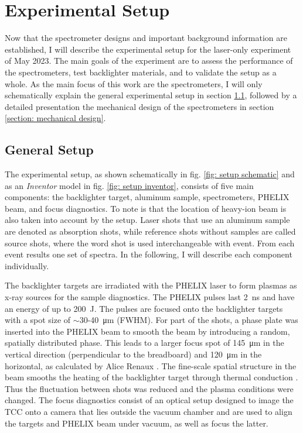\chapter{Experimental Setup}
\label{chapter: experimental setup}

Now that the spectrometer designs and important background information are 
established, I will describe the experimental setup for the laser-only 
experiment of May 2023. The main goals of the experiment are to assess the performance of the 
spectrometers, test backlighter materials, and to validate the setup as a 
whole. As the main focus of this work are the spectrometers, I will only 
schematically explain the general experimental setup in section \ref{section: general setup}, followed by a detailed presentation the mechanical design of the spectrometers in section \ref{section: mechanical design}. 

\section{General Setup}
\label{section: general setup}

The experimental setup, as shown schematically in fig. \ref{fig: setup 
schematic} and as an \textit{Inventor} model in fig. \ref{fig: setup inventor}, 
consists of five main components: the backlighter target, aluminum sample, 
spectrometers, 
PHELIX beam, and focus diagnostics. To note 
is that the location of heavy-ion 
beam is also taken into account by the setup. Laser shots that use an aluminum 
sample are denoted as 
absorption shots, while reference shots without samples are called source 
shots, where the word shot is used interchangeable with event. From each event results one set of 
spectra. In the following, I will describe each component individually.

The backlighter targets are irradiated with the PHELIX laser to form plasmas as 
x-ray sources for the sample diagnostics. The PHELIX pulses last \SI{2}{\nano\second} and have an energy of up to \SI{200}{\joule}. The pulses are focused onto the backlighter targets with a spot size of $\sim30$-\SI{40}{\micro\meter} (FWHM). For part of the shots, a phase plate was inserted into the 
PHELIX beam to smooth the beam by introducing a random, spatially distributed phase. This leads to a larger focus spot of \SI{145}{\micro\meter} in the vertical direction (perpendicular to the breadboard) and \SI{120}{\micro\meter} in the horizontal, as calculated by Alice Renaux \citep{alice_report}. The fine-scale spatial structure in the beam smooths the heating of the backlighter target through thermal conduction \citep{dixit1993random}. Thus the fluctuation between shots was reduced and the plasma conditions were changed. The focus diagnostics consist of an optical setup designed to 
image the TCC onto a camera that lies outside the vacuum chamber and are used to 
align the targets and PHELIX beam under vacuum, as well as focus the latter.

